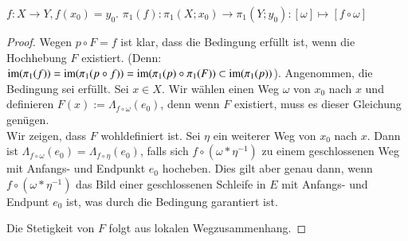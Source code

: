 \documentclass[a4paper,10pt]{scrartcl}
\begin{document}
\begin{note*}
 $f:X\to Y, f(x_0)=y_0$.  $\pi_1(f):\pi_1(X;x_0)\to \pi_1(Y;y_0): [\omega]\mapsto [f\circ \omega]$\\
\fixme[fig83] \fixme[fig84]
\end{note*}
\begin{proof}
 Wegen $p\circ F=f$ ist klar, dass die Bedingung erfüllt ist, wenn die Hochhebung $F$ existiert. (Denn: $\operatorname{im}(\pi_1(f))=\operatorname{im}(\pi_1(p\circ f))=\operatorname{im}(\pi_1(p)\circ \pi_1(F))\subset \operatorname{im}(\pi_1(p))$). Angenommen, die Bedingung sei erfüllt. Sei $x\in X$. Wir wählen einen Weg $\omega$ von $x_0$ nach $x$ und definieren $F(x):= \Lambda_{f\circ \omega}(e_0)$, denn wenn $F$ existiert, muss es dieser Gleichung genügen. 
\fixme[fig85]\\
Wir zeigen, dass $F$ wohldefiniert ist. Sei $\eta$ ein weiterer Weg von $x_0$ nach $x$. Dann ist $\Lambda_{f\circ \omega}(e_0)=\Lambda_{f\circ \eta} (e_0)$, falls sich $f\circ(\omega*\eta^{-1})$ zu einem geschlossenen Weg mit Anfangs- und Endpunkt $e_0$ hocheben. Dies gilt aber genau dann, wenn $f\circ(\omega*\eta^{-1})$ das Bild einer geschlossenen Schleife in $E$ mit Anfangs- und Endpunt $e_0$ ist, was durch die Bedingung garantiert ist.

Die Stetigkeit von $F$ folgt aus lokalen Wegzusammenhang.
\end{proof}












 
 
\end{document}
